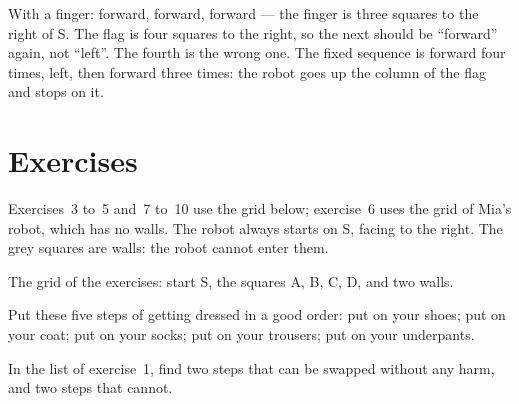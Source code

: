 \begin{example}\label{ex:g1:instructions-in-order:fix}
With a finger: forward, forward, forward --- the finger is three squares to
the right of S. The flag is four squares to the right, so the next 
should be ``forward'' again, not ``left''. The fourth  is the wrong
one. The fixed sequence is forward four times, left, then forward three times:
the robot goes up the column of the flag and stops on it.
\end{example}

\section{Exercises}

Exercises~3 to~5 and~7 to~10 use the grid below; exercise~6 uses the grid of
Mia's robot, which has no walls. The robot always starts on S, facing to
the right. The grey squares are walls: the robot cannot enter them.

\begin{omfigure}

{\small The grid of the exercises: start S, the squares A, B, C, D, and two
walls.}
\label{fig:g1:instructions-in-order:exercise-grid}
\end{omfigure}

\begin{exercise}[$\star$]\label{exo:g1:instructions-in-order:1}
Put these five steps of getting dressed in a good order: put on your shoes;
put on your coat; put on your socks; put on your trousers; put on your underpants.
\end{exercise}

\begin{exercise}[$\star$]\label{exo:g1:instructions-in-order:2}
In the list of exercise~1, find two steps that can be swapped without any
harm, and two steps that cannot.
\end{exercise}

